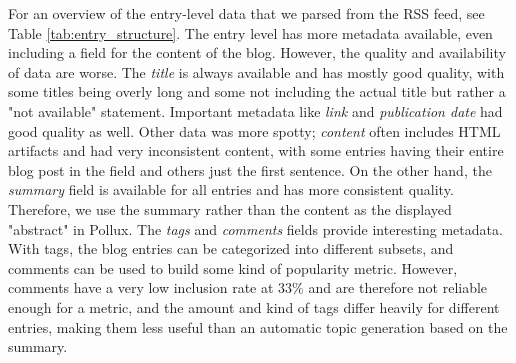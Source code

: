 \documentclass{article}
\begin{document}
For an overview of the entry-level data that we parsed from the RSS feed, see Table \ref{tab:entry_structure}. The entry level has more metadata available, even including a field for the content of the blog. However, the quality and availability of data are worse. The \textit{title} is always available and has mostly good quality, with some titles being overly long and some not including the actual title but rather a "not available" statement. Important metadata like \textit{link} and \textit{publication date} had good quality as well. Other data was more spotty; \textit{content} often includes HTML artifacts and had very inconsistent content, with some entries having their entire blog post in the field and others just the first sentence. On the other hand, the \textit{summary} field is available for all entries and has more consistent quality. Therefore, we use the summary rather than the content as the displayed "abstract" in Pollux. The \textit{tags} and \textit{comments} fields provide interesting metadata. With tags, the blog entries can be categorized into different subsets, and comments can be used to build some kind of popularity metric. However, comments have a very low inclusion rate at 33\% and are therefore not reliable enough for a metric, and the amount and kind of tags differ heavily for different entries, making them less useful than an automatic topic generation based on the summary.
\end{document}
